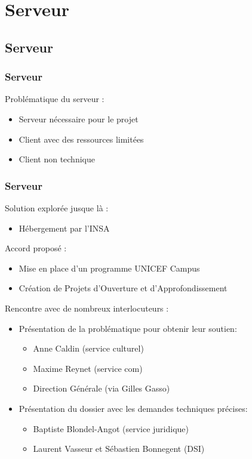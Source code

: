 

\speaker{\Matthieu}
\section{Serveur}
\subsection{Serveur}

\begin{frame}
	\frametitle{Serveur}
    Problématique du serveur :
      \begin{itemize}
        \item Serveur nécessaire pour le projet
        \item Client avec des ressources limitées
        \item Client non technique
      \end{itemize}
\end{frame}

\begin{frame}
	\frametitle{Serveur}
	Solution explorée jusque là :
	\begin{itemize}	
    \item Hébergement par l'INSA
    \end{itemize}
    
	Accord proposé :
	\begin{itemize}
		\item Mise en place d'un programme UNICEF Campus
		\item Création de Projets d’Ouverture et d’Approfondissement %
	\end{itemize}
\end{frame}

\begin{frame}
	 Rencontre avec de nombreux interlocuteurs :
	\begin{itemize}
    	\item Présentation de la problématique pour obtenir leur soutien:
		\begin{itemize}
			\item Anne Caldin (service culturel)
			\item Maxime Reynet (service com)
			\item Direction Générale (via Gilles Gasso)
		\end{itemize}
		\item Présentation du dossier avec les demandes techniques précises:
		\begin{itemize}
			\item Baptiste Blondel-Angot (service juridique)
			\item Laurent Vasseur et Sébastien Bonnegent (DSI)
		\end{itemize}    
	\end{itemize}    
\end{frame}

